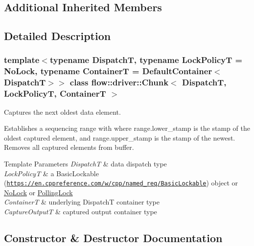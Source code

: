 \subsection*{Additional Inherited Members}


\subsection{Detailed Description}
\subsubsection*{template$<$typename DispatchT, typename Lock\+PolicyT = No\+Lock, typename ContainerT = Default\+Container$<$\+Dispatch\+T$>$$>$\newline
class flow\+::driver\+::\+Chunk$<$ Dispatch\+T, Lock\+Policy\+T, Container\+T $>$}

Captures the next oldest data element. 

Establishes a sequencing range with where {\ttfamily range.\+lower\+\_\+stamp} is the stamp of the oldest captured element, and {\ttfamily range.\+upper\+\_\+stamp} is the stamp of the newest. Removes all captured elements from buffer.


\begin{DoxyTemplParams}{Template Parameters}
{\em DispatchT} & data dispatch type \\
\hline
{\em Lock\+PolicyT} & a Basic\+Lockable (\href{https://en.cppreference.com/w/cpp/named_req/BasicLockable}{\tt https\+://en.\+cppreference.\+com/w/cpp/named\+\_\+req/\+Basic\+Lockable}) object or \hyperlink{structflow_1_1_no_lock}{No\+Lock} or \hyperlink{structflow_1_1_polling_lock}{Polling\+Lock} \\
\hline
{\em ContainerT} & underlying {\ttfamily DispatchT} container type \\
\hline
{\em Capture\+OutputT} & captured output container type \\
\hline
\end{DoxyTemplParams}


\subsection{Constructor \& Destructor Documentation}
\mbox{\label{classflow_1_1driver_1_1_chunk_a553b7e56f8aad7c2630e4655d8b72097}} 
